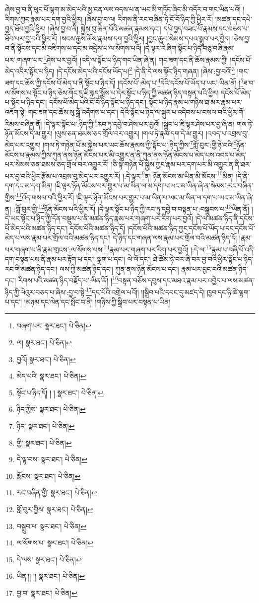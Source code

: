 ཞེས་བྱ་བ་ནི་ཕུང་པོ་ལྷག་མ་མེད་པའི་མྱ་ངན་ལས་འདས་པ་ན་ཡང་མི་གཏོང་ཞིང་མི་འདོར་བ་གང་ཡིན་པའོ། །རིགས་ཀྱང་རྣམ་པར་དག་བྱའི་ཕྱིར། །ཞེས་བྱ་བ་ལ། རིགས་ནི་རང་བཞིན་ཏེ་ངོ་བོ་ཉིད་ཀྱི་ཕྱིར་རོ། །མཚན་དང་དཔེ་བྱད་ཐོབ་བྱའི་ཕྱིར། །ཞེས་བྱ་བ་ནི། སྐྱེས་བུ་ཆེན་པོའི་མཚན་རྣམས་དང་། དཔེ་བྱད་བཟང་པོ་རྣམས་དང་བཅས་པ་ཐོབ་པར་བྱ་བའི་ཕྱིར་རོ། །སངས་རྒྱས་ཆོས་རྣམས་དག་བྱའི་ཕྱིར། །བྱང་ཆུབ་སེམས་དཔའ་སྒྲུབ་པར་བྱེད། །ཅེས་བྱ་བ་ནི་སྟོབས་དང་མི་འཇིགས་པ་དང་མ་འདྲེས་པ་ལ་སོགས་པའོ། །དེ་ལྟར་རེ་ཞིག་སྟོང་པ་ཉིད་བཅུ་བཞི་རྣམ་པར་:གཞག་པར་\footnote{བཞག་པར་  སྣར་ཐང་།  པེ་ཅིན། }ཤེས་པར་བྱའོ། །འདི་ལ་སྟོང་པ་ཉིད་གང་ཡིན་ཞེ་ན། གང་ཟག་དང་ནི་ཆོས་རྣམས་ཀྱི། །དངོས་པོ་མེད་འདིར་སྟོང་པ་ཉིད། །དེ་དངོས་མེད་པའི་དངོས་ཡོད་པ།\footnote{ལ།  སྣར་ཐང་།  པེ་ཅིན། } །དེ་ནི་དེ་ལས་སྟོང་ཉིད་གཞན། །ཞེས་:བྱ་བའོ།\footnote{བྱའོ།  སྣར་ཐང་།  པེ་ཅིན། } །གང་ཟག་དང་ཆོས་ཀྱི་དངོས་པོ་མེད་པ་ནི་སྟོང་པ་ཉིད་དོ། །དངོས་པོ་:མེད་པ་\footnote{མེད་པའི་  སྣར་ཐང་།  པེ་ཅིན། }དེའི་དངོས་པོ་ཡོད་པ་ཡང་:ཡིན་ནོ། །\footnote{སྟོང་པ་ཉིད་དོ། ། །  སྣར་ཐང་།  པེ་ཅིན། }ཟ་བ་ལ་སོགས་པ་སྟོང་པ་ཉིད་ཅེས་གོང་དུ་ཇི་སྐད་སྨོས་པ་དེར་སྟོང་པ་ཉིད་ཀྱི་མཚན་ཉིད་བསྟན་པའི་ཕྱིར། དངོས་པོ་མེད་པ་སྟོང་པ་ཉིད་དང་། དངོས་པོ་མེད་པའི་ངོ་བོ་ཉིད་སྟོང་པ་ཉིད་དང་། སྟོང་པ་ཉིད་རྣམ་པ་གཉིས་ཐ་མར་རྣམ་པར་འཇོག་སྟེ། གང་ཟག་དང་ཆོས་སུ་སྒྲོ་འདོགས་པ་དང་། དེའི་སྟོང་པ་ཉིད་ལ་སྐུར་པ་འདེབས་པ་བསལ་བའི་ཕྱིར་གོ་རིམས་བཞིན་ནོ། །དེ་ལྟར་སྟོང་པ་:ཉིད་ཀྱི་\footnote{ཉིད་ཀྱིས་  སྣར་ཐང་།  པེ་ཅིན། }རབ་ཏུ་དབྱེ་བ་ཤེས་པར་བྱའོ། །སྒྲུབ་པ་ཇི་ལྟར་ཤེས་པར་བྱ་ཞེ་ན། གལ་ཏེ་ཉོན་མོངས་དེ་མ་གྱུར། །ལུས་ཅན་ཐམས་ཅད་གྲོལ་བར་འགྱུར། །གལ་ཏེ་རྣམ་དག་དེ་མ་གྱུར། །འབད་པ་འབྲས་བུ་མེད་པར་འགྱུར། །གལ་ཏེ་གཉེན་པོ་མ་སྐྱེས་པར་ཡང་ཆོས་རྣམས་ཀྱི་སྟོང་པ་:ཉིད་ཀྱིས་\footnote{ཉིད་  སྣར་ཐང་།  པེ་ཅིན། }གློ་བུར་:གྱི་ཉེ་བའི་\footnote{གྱི་  སྣར་ཐང་།  པེ་ཅིན། }ཉོན་མོངས་པ་རྣམས་ཀྱིས་ཀུན་ནས་ཉོན་མོངས་པར་མི་འགྱུར་ན་ནི་ཀུན་ནས་ཉོན་མོངས་པ་མེད་པས་འབད་པ་མེད་པར་སེམས་ཅན་ཐམས་ཅད་གྲོལ་བར་འགྱུར་རོ། །ཅི་སྟེ་གཉེན་པོ་སྐྱེས་ཀྱང་རྣམ་པར་དག་པར་མི་འགྱུར་ན་ནི་ཐར་པར་བྱ་བའི་ཕྱིར་རྩོམ་པ་འབྲས་བུ་མེད་པར་འགྱུར་རོ། །:དེ་ལྟར་\footnote{དེ་ལྟ་བས་  སྣར་ཐང་།  པེ་ཅིན། }ན། ཉོན་མོངས་མ་ཡིན་མི་མོངས་\footnote{རྨོངས་  སྣར་ཐང་།  པེ་ཅིན། }མིན། །དེ་ནི་དག་དང་མ་དག་མིན། །ཇི་ལྟར་ཉོན་མོངས་པར་གྱུར་པ་མ་ཡིན་ལ་མ་དག་པ་ཡང་མ་ཡིན་ཞེ་ན་སེམས་:རང་བཞིན་གྱིས་\footnote{རང་བཞིན་གྱི་  སྣར་ཐང་།  པེ་ཅིན། }འོད་གསལ་བའི་ཕྱིར་རོ། །ཇི་ལྟར་ཉོན་མོངས་པར་གྱུར་པ་མ་ཡིན་པ་ཡང་མ་ཡིན་ལ་དག་པ་ཡང་མ་ཡིན་ཞེ་ན། :གློ་བུར་གྱི་\footnote{གློ་བུར་གྱིས་  སྣར་ཐང་།  པེ་ཅིན། }ཉོན་མོངས་པའི་ཕྱིར་རོ། །དེ་ལྟར་སྟོང་པ་ཉིད་ཀྱི་རབ་ཏུ་དབྱེ་བ་བསྟན་པ་:བསྒྲུབས་པ་\footnote{བསྒྲུབ་པ་  སྣར་ཐང་།  པེ་ཅིན། }ཡིན་ནོ། །དེ་ཡང་སྟོང་པ་ཉིད་ཀྱི་དོན་བསྡུས་པ་ནི་མཚན་ཉིད་རྣམ་པར་གཞག་པར་རིག་པར་བྱའོ། །དེ་ལ་མཚན་ཉིད་ནི་དངོས་པོ་མེད་པའི་མཚན་ཉིད་དང་། དངོས་པོའི་མཚན་ཉིད་དོ། །དངོས་པོའི་མཚན་ཉིད་ཀྱང་དངོས་པོ་ཡོད་པ་དང་དངོས་པོ་མེད་པ་ལས་རྣམ་པར་གྲོལ་བའི་མཚན་ཉིད་དང་། དེ་ཉིད་དང་གཞན་ལས་རྣམ་པར་གྲོལ་བའི་མཚན་ཉིད་དོ། །རྣམ་པར་གཞག་པ་ནི་རྣམ་གྲངས་:ལ་སོགས་པས་\footnote{ལ་སོགས་པ་  སྣར་ཐང་།  པེ་ཅིན། }རྣམ་པར་གཞག་པར་རིག་པར་བྱའོ། །:དེ་ལ་\footnote{དེ་ལས་  སྣར་ཐང་།  པེ་ཅིན། }རྣམ་པ་བཞི་པོ་འདི་དག་བསྟན་པས་ནི་རྣམ་པར་རྟོག་པ་དང་། སྐྲག་པ་དང་། ལེ་ལོ་དང་། ཐེ་ཚོམ་ཉེ་བར་ཞི་བར་བྱ་བའི་ཕྱིར་སྟོང་པ་ཉིད་རང་གི་མཚན་ཉིད་དང་། ལས་ཀྱི་མཚན་ཉིད་དང་། ཀུན་ནས་ཉོན་མོངས་པ་དང་། རྣམ་པར་བྱང་བའི་མཚན་ཉིད་དང་། རིགས་པའི་མཚན་ཉིད་བརྗོད་པ་:ཡིན་ནོ། །\footnote{ཡིན་།། །།  སྣར་ཐང་།  པེ་ཅིན། }བསྟན་བཅོས་དབུས་དང་མཐའ་རྣམ་པར་འབྱེད་པ་ལས་མཚན་ཉིད་ཀྱི་ལེའུར་བཅད་པ་ཞེས་:བྱ་བ་སྟེ་\footnote{བྱ་བ་  སྣར་ཐང་།  པེ་ཅིན། }དང་པོའི་འགྲེལ་པའོ།། །།སྒྲིབ་པའི་དབང་དུ་མཛད་དེ། ཁྱབ་དང་ཉི་ཚེ་ལྷག་པ་དང་། །མཉམ་དང་ལེན་དང་སྤོང་བ་ནི། །གཉིས་ཀྱི་སྒྲིབ་པར་བསྟན་པ་ཡིན། 